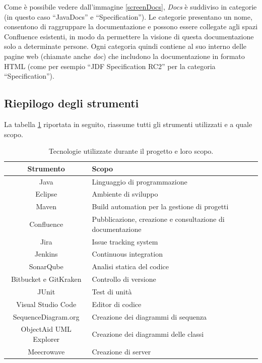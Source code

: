    Come è possibile vedere dall'immagine \ref{screenDocs}, \emph{Docs} è suddiviso in categorie (in questo caso ``JavaDocs'' e ``Specification'').
    Le categorie presentano un nome, consentono di raggruppare la documentazione e possono essere collegate agli spazi Confluence esistenti, in modo da permettere la visione di questa documentazione solo a determinate persone.
    Ogni categoria quindi contiene al suo interno delle pagine web (chiamate anche \emph{doc}) che includono la documentazione in formato HTML \cite{site:docs-plugin} (come per esempio ``JDF Specification RC2'' per la categoria ``Specification'').


    \subsection{Riepilogo degli strumenti}

    La tabella \ref{tabellaStrumenti} riportata in seguito, riassume tutti gli strumenti utilizzati e a quale scopo.

        \begin{table}[H]
            {\def\arraystretch{1.5}
            \begin{tabularx}{\textwidth}{cX}
                \rowcolor{beautyblue}
                \textbf{Strumento} &
                \textbf{Scopo} \\ \hline
                Java & Linguaggio di programmazione \\
                Eclipse & Ambiente di sviluppo \\
                Maven & Build automation per la gestione di progetti \\
                Confluence & Pubblicazione, creazione e consultazione di documentazione \\
                Jira & Issue tracking system \\
                Jenkins & Continuous integration \\
                SonarQube & Analisi statica del codice \\
                Bitbucket e GitKraken & Controllo di versione \\
                JUnit & Test di unità \\
                Visual Studio Code & Editor di codice \\
                SequenceDiagram.org & Creazione dei diagrammi di sequenza \\
                ObjectAid UML Explorer & Creazione dei diagrammi delle classi \\
                Meecrowave & Creazione di server \\
            \end{tabularx}} \\
        \caption{Tecnologie utilizzate durante il progetto e loro scopo.}
        \label{tabellaStrumenti}
        \end{table}


